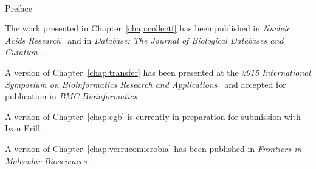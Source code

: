 
\renewcommand{\baselinestretch}{2}
\small\normalsize
\hbox{\ }

\vspace{-.65in}

\begin{center}
\large{Preface}
\end{center}


The work presented in Chapter~\ref{chap:collectf} has been published in
\textit{Nucleic Acids Research}~\citep{kilic2013collectf} and in
\textit{Database: The Journal of Biological Databases and
  Curation}~\citep{kilic2016data}.

A version of Chapter~\ref{chap:transfer} has been presented at the \textit{2015
International Symposium on Bioinformatics Research and Applications}~\citep{kilic2015assessment}
and accepted for publication in \textit{BMC
  Bioinformatics}~\citep{kilic2016assessment}

A version of Chapter~\ref{chap:cgb} is currently in preparation for submission
with Ivan Erill.

A version of Chapter~\ref{chap:verrucomicrobia} has been published in
\textit{Frontiers in Molecular Biosciences}~\citep{erill2016verrucomicrobia}.
